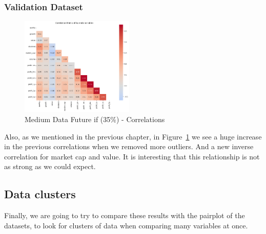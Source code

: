 \documentclass[11pt,english,a4paper,hidelinks]{book}
\begin{document}
\subsubsection{Validation Dataset}

\begin{figure}[H]
    \centering
    \includegraphics[width=0.48\textwidth]{images/code/descriptive analysis/correlations/Medium future - IF HARD.png}
    \caption{Medium Data Future \acrshort{if} (35\%) - Correlations}
    \label{fig:medium_data_future_if_correlations}
\end{figure}


\noindent Also, as we mentioned in the previous chapter, in Figure~\ref{fig:medium_data_future_if_correlations} we see a huge increase in the previous correlations when we removed more outliers. And a new inverse correlation for market cap and value. It is interesting that this relationship is not as strong as we could expect.

\newpage

\subsection{Data clusters}
Finally, we are going to try to compare these results with the \acrshort{pairplot} of the datasets, to look for clusters of data when comparing many variables at once.
\end{document}
